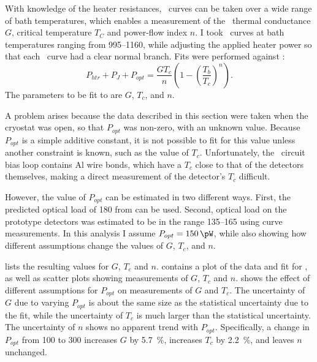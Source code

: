 %
%

With knowledge of the heater resistances, \IV\ curves can be taken over a wide range of bath temperatures, which enables a measurement of the \TES\ thermal conductance $G$, critical temperature $T_C$ and power-flow index $n$.
I took \IV\ curves at bath temperatures ranging from \SIrange{995}{1160}{\mK}, while adjusting the applied heater power so that each \IV\ curve had a clear normal branch.
Fits were performed against :
\begin{equation}\label{eqn:g-fit}
P_{htr} + P_J + P_{opt}= \frac{G T_c}{n}\left(1 - \left(\frac{T_b}{T_c}\right)^n\right).
\end{equation}
The parameters to be fit to are $G$, $T_c$, and $n$.

A problem arises because the data described in this section were taken when the cryostat was open, so that $P_{opt}$ was non-zero, with an unknown value.
Because $P_{opt}$ is a simple additive constant, it is not possible to fit for this value unless another constraint is known, such as the value of $T_c$.
Unfortunately, the \TES\ circuit bias loop contains Al wire bonds, which have a $T_c$ close to that of the detectors themselves, making a direct measurement of the detector's $T_c$ difficult.

However, the value of $P_{opt}$ can be estimated in two different ways. 
First, the predicted optical load of \SI{180}{\pW} from  can be used.
Second, optical load on the prototype detectors was estimated to be in the range \SIrange{135}{165}{\pW} using \IV curve measurements.
In this analysis I assume $P_{opt} = \SI{150}{\pW}$, while also showing how different assumptions change the values of  $G$, $T_c$, and $n$.

 lists the resulting values for $G$, $T_c$ and $n$.
 contains a plot of the data and fit for , as well as scatter plots showing measurements of $G$, $T_c$ and $n$.
 shows the effect of different assumptions for $P_{opt}$ on measurements of $G$ and $T_c$.
The uncertainty of $G$ due to varying $P_{opt}$ is about the same size as the statistical uncertainty due to the fit, while the uncertainty of $T_c$ is much larger than the statistical uncertainty.
The uncertainty of $n$ shows no apparent trend with $P_{opt}$.
Specifically, a change in $P_{opt}$ from \SI{100}{\pW} to \SI{300}{\pW} increases $G$ by \SI{5.7}{\percent}, increases $T_c$ by \SI{2.2}{\percent}, and leaves $n$ unchanged.


